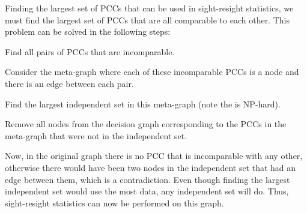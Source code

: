 \begin{appendices}
Finding the largest set of PCCs that can be used in sight-resight statistics, we must find the largest set of
  PCCs that are all comparable to each other.
This problem can be solved in the following steps:
\begin{enumln}
\item Find all pairs of PCCs that are incomparable.
\item Consider the meta-graph where each of these incomparable PCCs is a node and there is an edge between each
  pair.
\item Find the largest independent set in this meta-graph (note the is NP-hard).
\item Remove all nodes from the decision graph corresponding to the PCCs in the meta-graph that were not in the
  independent set.
\end{enumln}
Now, in the original graph there is no PCC that is incomparable with any other, otherwise there would have been
  two nodes in the independent set that had an edge between them, which is a contradiction.
Even though finding the largest independent set would use the most data, any independent set will do.
Thus, sight-resight statistics can now be performed on this graph.
  

\end{appendices}
